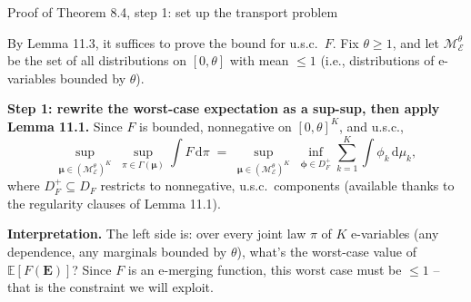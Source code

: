 \documentclass[aspectratio=169,10pt]{beamer}
\newcommand{\EE}{\mathbb{E}}
\newcommand{\1}{\mathbb{1}}
\begin{document}
\begin{frame}[allowframebreaks]{Proof of Theorem 8.4, step 1: set up the transport problem}

By Lemma 11.3, it suffices to prove the bound for u.s.c.\ $F$. Fix $\theta \ge 1$, and let $\mathcal{M}_{\mathcal E}^\theta$ be the set of all distributions on $[0,\theta]$ with mean $\le 1$ (i.e., distributions of e-variables bounded by $\theta$).

\textbf{Step 1: rewrite the worst-case expectation as a sup-sup, then apply Lemma 11.1.} Since $F$ is bounded, nonnegative on $[0,\theta]^K$, and u.s.c.,
\[
\sup_{\boldsymbol\mu \in (\mathcal M_{\mathcal E}^\theta)^K} \; \sup_{\pi\in\Gamma(\boldsymbol\mu)} \int F\,\mathrm{d}\pi
\;=\; \sup_{\boldsymbol\mu \in (\mathcal M_{\mathcal E}^\theta)^K} \; \inf_{\boldsymbol\phi \in D_F^+} \sum_{k=1}^K \int \phi_k \,\mathrm{d}\mu_k,
\tag{11.2}
\]
where $D_F^+ \subseteq D_F$ restricts to nonnegative, u.s.c.\ components (available thanks to the regularity clauses of Lemma 11.1).

\textbf{Interpretation.} The left side is: over every joint law $\pi$ of $K$ e-variables (any dependence, any marginals bounded by $\theta$), what's the worst-case value of $\EE[F(\mathbf E)]$? Since $F$ is an e-merging function, this worst case must be $\le 1$ -- that is the constraint we will exploit.

\end{frame}
\end{document}
